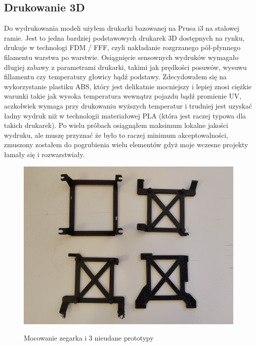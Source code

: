 \documentclass[declaration,shortabstract, inz]{iithesis}
\begin{document}
  
\subsection{Drukowanie 3D}
    Do wydrukowania modeli użyłem drukarki bazowanej na Prusa i3 na stalowej ramie. Jest to jedna bardziej podstawowych drukarek 3D dostępnych na rynku, drukuje w technologi FDM / FFF, czyli nakładanie rozgrzanego pół-płynnego filamentu warstwa po warstwie. Osiągnięcie sensownych wydruków wymagało długiej zabawy z parametrami drukarki, takimi jak prędkości posuwów, wysuwu fillamentu czy temperatury głowicy bądź podstawy. Zdecydowałem się na wykorzystanie plastiku ABS, który jest delikatnie mocniejszy i lepiej znosi ciężkie warunki takie jak wysoka temperatura wewnątrz pojazdu bądź promienie UV, aczkolwiek wymaga przy drukowaniu wyższych temperatur i trudniej jest uzyskać ładny wydruk niż w technologii materiałowej PLA (która jest raczej typowa dla takich drukarek). Po wielu próbach osiągnąłem maksimum lokalne jakości wydruku, ale muszę przyznać że było to raczej minimum akceptowalności, zmuszony zostałem do pogrubienia wielu elementów gdyż moje wczesne projekty łamały się i rozwarstwiały.
    
    \begin{figure}[htp]
        \centering
        \includegraphics[width=12cm]{images/mounting.jpg}
        \label{fig:mounting}
        \caption{Mocowanie zegarka i 3 nieudane prototypy}
    \end{figure}
    \FloatBarrier
\end{document}
